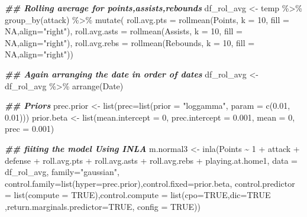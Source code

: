 \documentclass[
]{article}
\newenvironment{Shaded}{\begin{snugshade}}{\end{snugshade}}
\newcommand{\AttributeTok}[1]{\textcolor[rgb]{0.77,0.63,0.00}{#1}}
\newcommand{\ConstantTok}[1]{\textcolor[rgb]{0.00,0.00,0.00}{#1}}
\newcommand{\DecValTok}[1]{\textcolor[rgb]{0.00,0.00,0.81}{#1}}
\newcommand{\DocumentationTok}[1]{\textcolor[rgb]{0.56,0.35,0.01}{\textbf{\textit{#1}}}}
\newcommand{\FloatTok}[1]{\textcolor[rgb]{0.00,0.00,0.81}{#1}}
\newcommand{\FunctionTok}[1]{\textcolor[rgb]{0.00,0.00,0.00}{#1}}
\newcommand{\NormalTok}[1]{#1}
\newcommand{\OtherTok}[1]{\textcolor[rgb]{0.56,0.35,0.01}{#1}}
\newcommand{\SpecialCharTok}[1]{\textcolor[rgb]{0.00,0.00,0.00}{#1}}
\newcommand{\StringTok}[1]{\textcolor[rgb]{0.31,0.60,0.02}{#1}}
\begin{document}
\begin{Shaded}
\begin{Highlighting}[]
\DocumentationTok{\#\# Rolling average for points,assists,rebounds}
\NormalTok{df\_rol\_avg }\OtherTok{\textless{}{-}}\NormalTok{ temp }\SpecialCharTok{\%\textgreater{}\%} \FunctionTok{group\_by}\NormalTok{(attack) }\SpecialCharTok{\%\textgreater{}\%} 
  \FunctionTok{mutate}\NormalTok{(}
    \AttributeTok{roll.avg.pts =} \FunctionTok{rollmean}\NormalTok{(Points, }\AttributeTok{k =} \DecValTok{10}\NormalTok{, }\AttributeTok{fill =} \ConstantTok{NA}\NormalTok{,}\AttributeTok{align=}\StringTok{"right"}\NormalTok{),}
    \AttributeTok{roll.avg.asts =} \FunctionTok{rollmean}\NormalTok{(Assists, }\AttributeTok{k =} \DecValTok{10}\NormalTok{, }\AttributeTok{fill =} \ConstantTok{NA}\NormalTok{,}\AttributeTok{align=}\StringTok{"right"}\NormalTok{),}
    \AttributeTok{roll.avg.rebs =} \FunctionTok{rollmean}\NormalTok{(Rebounds, }\AttributeTok{k =} \DecValTok{10}\NormalTok{, }\AttributeTok{fill =} \ConstantTok{NA}\NormalTok{,}\AttributeTok{align=}\StringTok{"right"}\NormalTok{))}

\DocumentationTok{\#\# Again arranging the date in order of dates}
\NormalTok{df\_rol\_avg }\OtherTok{\textless{}{-}}\NormalTok{ df\_rol\_avg }\SpecialCharTok{\%\textgreater{}\%} \FunctionTok{arrange}\NormalTok{(Date)}

\DocumentationTok{\#\# Priors}
\NormalTok{prec.prior }\OtherTok{\textless{}{-}} \FunctionTok{list}\NormalTok{(}\AttributeTok{prec=}\FunctionTok{list}\NormalTok{(}\AttributeTok{prior =} \StringTok{"loggamma"}\NormalTok{, }\AttributeTok{param =} \FunctionTok{c}\NormalTok{(}\FloatTok{0.01}\NormalTok{, }\FloatTok{0.01}\NormalTok{)))}
\NormalTok{prior.beta }\OtherTok{\textless{}{-}} \FunctionTok{list}\NormalTok{(}\AttributeTok{mean.intercept =} \DecValTok{0}\NormalTok{, }\AttributeTok{prec.intercept =} \FloatTok{0.001}\NormalTok{, }\AttributeTok{mean =} \DecValTok{0}\NormalTok{, }\AttributeTok{prec =} \FloatTok{0.001}\NormalTok{)}

\DocumentationTok{\#\# fiiting the model Using INLA}
\NormalTok{m.normal3 }\OtherTok{\textless{}{-}} \FunctionTok{inla}\NormalTok{(Points }\SpecialCharTok{\textasciitilde{}} \DecValTok{1} \SpecialCharTok{+}\NormalTok{ attack }\SpecialCharTok{+}\NormalTok{ defense }\SpecialCharTok{+}\NormalTok{ roll.avg.pts }\SpecialCharTok{+}\NormalTok{ roll.avg.asts }\SpecialCharTok{+}\NormalTok{ roll.avg.rebs }\SpecialCharTok{+}\NormalTok{ playing.at.home1, }\AttributeTok{data =}\NormalTok{ df\_rol\_avg, }\AttributeTok{family=}\StringTok{"gaussian"}\NormalTok{, }\AttributeTok{control.family=}\FunctionTok{list}\NormalTok{(}\AttributeTok{hyper=}\NormalTok{prec.prior),}\AttributeTok{control.fixed=}\NormalTok{prior.beta, }\AttributeTok{control.predictor =} \FunctionTok{list}\NormalTok{(}\AttributeTok{compute =} \ConstantTok{TRUE}\NormalTok{),}\AttributeTok{control.compute =} \FunctionTok{list}\NormalTok{(}\AttributeTok{cpo=}\ConstantTok{TRUE}\NormalTok{,}\AttributeTok{dic=}\ConstantTok{TRUE}\NormalTok{ ,}\AttributeTok{return.marginals.predictor=}\ConstantTok{TRUE}\NormalTok{, }\AttributeTok{config =} \ConstantTok{TRUE}\NormalTok{))}


\end{Highlighting}
\end{Shaded}
\end{document}
